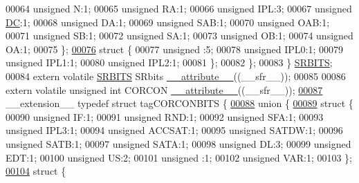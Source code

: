 \begin{DoxyCode}
00064       \textcolor{keywordtype}{unsigned} N:1;
00065       \textcolor{keywordtype}{unsigned} RA:1;
00066       \textcolor{keywordtype}{unsigned} IPL:3;
00067       \textcolor{keywordtype}{unsigned} \hyperlink{a00011_a0caba21dab832e280875be65012b30fc}{DC}:1;
00068       \textcolor{keywordtype}{unsigned} DA:1;
00069       \textcolor{keywordtype}{unsigned} SAB:1;
00070       \textcolor{keywordtype}{unsigned} OAB:1;
00071       \textcolor{keywordtype}{unsigned} SB:1;
00072       \textcolor{keywordtype}{unsigned} SA:1;
00073       \textcolor{keywordtype}{unsigned} OB:1;
00074       \textcolor{keywordtype}{unsigned} OA:1;
00075     \};
\hypertarget{a00009_source_l00076}{}\hyperlink{a00009}{00076}     \textcolor{keyword}{struct }\{
00077       \textcolor{keywordtype}{unsigned} :5;
00078       \textcolor{keywordtype}{unsigned} IPL0:1;
00079       \textcolor{keywordtype}{unsigned} IPL1:1;
00080       \textcolor{keywordtype}{unsigned} IPL2:1;
00081     \};
00082   \};
00083 \} \hyperlink{a00008_d3/dee/a00774}{SRBITS};
00084 \textcolor{keyword}{extern} \textcolor{keyword}{volatile} \hyperlink{a00008_d3/dee/a00774}{SRBITS} SRbits \hyperlink{a00009_a493c46f03454991ccc5aa7a6e1dfb2a7}{\_\_attribute\_\_}((\_\_sfr\_\_));
00085 
00086 \textcolor{keyword}{extern} \textcolor{keyword}{volatile} \textcolor{keywordtype}{unsigned} \textcolor{keywordtype}{int}  CORCON \hyperlink{a00009_a493c46f03454991ccc5aa7a6e1dfb2a7}{\_\_attribute\_\_}((\_\_sfr\_\_));
\hypertarget{a00009_source_l00087}{}\hyperlink{a00008}{00087} \_\_extension\_\_ \textcolor{keyword}{typedef} \textcolor{keyword}{struct }tagCORCONBITS \{
\hypertarget{a00009_source_l00088}{}\hyperlink{a00009}{00088}   \textcolor{keyword}{union }\{
\hypertarget{a00009_source_l00089}{}\hyperlink{a00009}{00089}     \textcolor{keyword}{struct }\{
00090       \textcolor{keywordtype}{unsigned} IF:1;
00091       \textcolor{keywordtype}{unsigned} RND:1;
00092       \textcolor{keywordtype}{unsigned} SFA:1;
00093       \textcolor{keywordtype}{unsigned} IPL3:1;
00094       \textcolor{keywordtype}{unsigned} ACCSAT:1;
00095       \textcolor{keywordtype}{unsigned} SATDW:1;
00096       \textcolor{keywordtype}{unsigned} SATB:1;
00097       \textcolor{keywordtype}{unsigned} SATA:1;
00098       \textcolor{keywordtype}{unsigned} DL:3;
00099       \textcolor{keywordtype}{unsigned} EDT:1;
00100       \textcolor{keywordtype}{unsigned} US:2;
00101       \textcolor{keywordtype}{unsigned} :1;
00102       \textcolor{keywordtype}{unsigned} VAR:1;
00103     \};
\hypertarget{a00009_source_l00104}{}\hyperlink{a00009}{00104}     \textcolor{keyword}{struct }\{

\end{DoxyCode}
